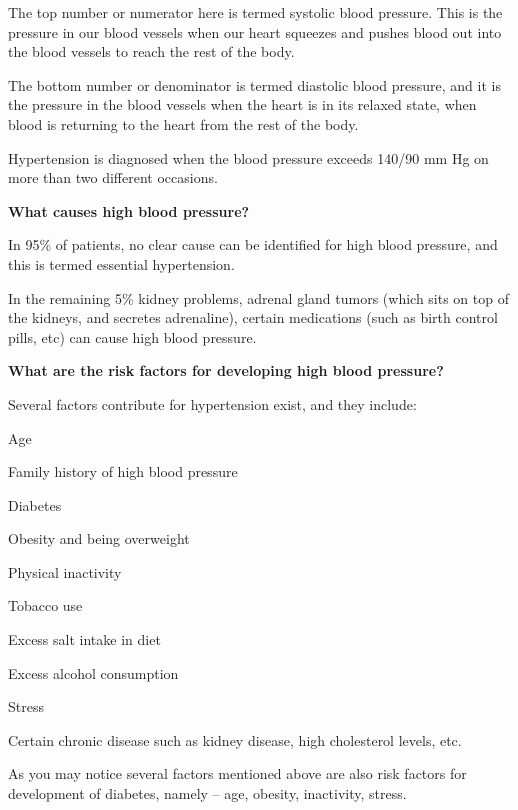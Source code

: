 {The top number or numerator here is termed systolic blood pressure. This is the pressure in our blood vessels when our heart squeezes and pushes blood out into the blood vessels to reach the rest of the body.

The bottom number or denominator is termed diastolic blood pressure, and it is the pressure in the blood vessels when the heart is in its relaxed state, when blood is returning to the heart from the rest of the body.

Hypertension is diagnosed when the blood pressure exceeds 140/90 mm Hg on more than two different occasions.

\textbf{What causes high blood pressure?}

In 95\% of patients, no clear cause can be identified for high blood pressure, and this is termed essential hypertension.

In the remaining 5\% kidney problems, adrenal gland tumors (which sits on top of the kidneys, and secretes adrenaline), certain medications (such as birth control pills, etc) can cause high blood pressure.

\textbf{What are the risk factors for developing high blood pressure?}

Several factors contribute for hypertension exist, and they include:

\item Age

 \item Family history of high blood pressure

 \item Diabetes

 \item Obesity and being overweight

 \item Physical inactivity

 \item Tobacco use

 \item Excess salt intake in diet

 \item Excess alcohol consumption

 \item Stress

 \item Certain chronic disease such as kidney disease, high cholesterol levels, etc.

As you may notice several factors mentioned above are also risk factors for development of diabetes, namely – age, obesity, inactivity, stress.

}
